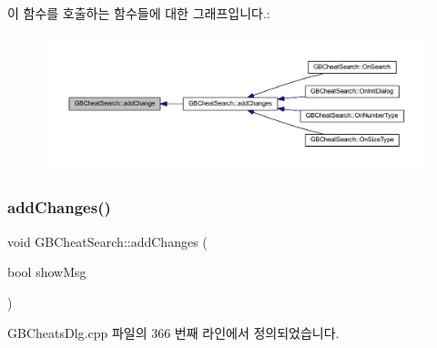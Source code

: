 이 함수를 호출하는 함수들에 대한 그래프입니다.\+:
\nopagebreak
\begin{figure}[H]
\begin{center}
\leavevmode
\includegraphics[width=350pt]{class_g_b_cheat_search_a1765135b0200e93b3d8fd13c8c9c2ea0_icgraph}
\end{center}
\end{figure}
\mbox{\label{class_g_b_cheat_search_a10b0314fc3b27cda2e217539c9c1e052}} 
\subsubsection{\texorpdfstring{add\+Changes()}{addChanges()}}
{\footnotesize\ttfamily void G\+B\+Cheat\+Search\+::add\+Changes (\begin{DoxyParamCaption}\item[{bool}]{show\+Msg }\end{DoxyParamCaption})}



G\+B\+Cheats\+Dlg.\+cpp 파일의 366 번째 라인에서 정의되었습니다.


